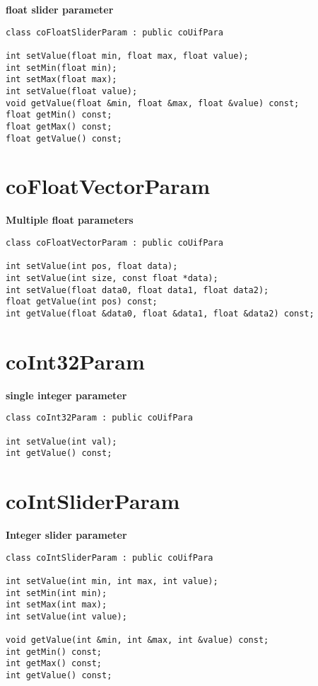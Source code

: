 {\bf float slider parameter}

\begin{verbatim}
class coFloatSliderParam : public coUifPara
 
int setValue(float min, float max, float value);
int setMin(float min);
int setMax(float max);
int setValue(float value);
void getValue(float &min, float &max, float &value) const;
float getMin() const;
float getMax() const;
float getValue() const;
\end{verbatim}
 

\section{coFloatVectorParam}

{\bf Multiple float parameters}

\begin{verbatim}
class coFloatVectorParam : public coUifPara
 
int setValue(int pos, float data);
int setValue(int size, const float *data);
int setValue(float data0, float data1, float data2);
float getValue(int pos) const;
int getValue(float &data0, float &data1, float &data2) const;
\end{verbatim}
 

\section{coInt32Param}

{\bf single integer parameter}

\begin{verbatim}
class coInt32Param : public coUifPara

int setValue(int val);
int getValue() const;
\end{verbatim}
 

\section{coIntSliderParam}

{\bf Integer slider parameter}

\begin{verbatim}
class coIntSliderParam : public coUifPara

int setValue(int min, int max, int value);
int setMin(int min);
int setMax(int max);
int setValue(int value);
 
void getValue(int &min, int &max, int &value) const;
int getMin() const;
int getMax() const;
int getValue() const;
\end{verbatim}


